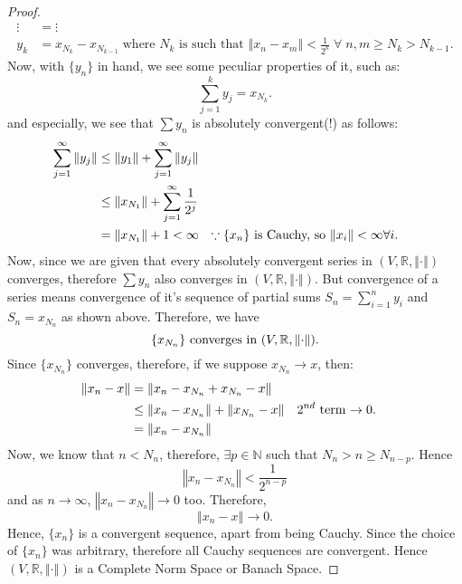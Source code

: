 \documentclass{article}
\theoremstyle{definition}
\theoremstyle{remark}
\theoremstyle{definition}
\theoremstyle{definition}
\theoremstyle{definition}
\newcommand{\norm}[1]{\left \Vert #1 \right \Vert}
\newcommand{\R}{\mathbb{R}}
\newcommand{\N}{\mathbb{N}}
\begin{document}
\begin{proof}
\begin{align*}
		\vdots &= \vdots\\
			y_k &= x_{N_k} - x_{N_{k-1}} \;\text{where } N_k \text{ is such that } \norm{x_n - x_m} < \frac{1}{2^{k}}  \;\forall\; n,m\ge N_k > N_{k-1}.
\end{align*}
Now, with $ \{y_n\} $ in hand, we see some peculiar properties of it, such as:
\[\sum_{j=1}^{k} y_j= x_{N_k}.\]
and especially, we see that $ \sum y_n $ is absolutely convergent(!) as follows:
\begin{align*}
	\sum_{j=1}^{\infty} \norm{y_j} &\le \norm{y_1} + \sum_{j=1}^{\infty} \norm{y_j}\\
	&\le \norm{x_{N_1}} + \sum_{j=1}^{\infty} \frac{1}{2^{j}}\\
	&= \norm{x_{N_1}} + 1 < \infty&&\text{$ \because \{x_n\}$ is Cauchy, so $ \norm{x_i} < \infty\forall i$. }
\end{align*} 
Now, since we are given that every absolutely convergent series in $ (V,\R,\norm{\cdot}) $ converges, therefore $ \sum y_n $ also converges in $ (V,\R,\norm{\cdot}) $. But convergence of a series means convergence of it's sequence of partial sums $ S_n = \sum_{i=1}^{n} y_i $ and $ S_n = x_{N_{n}} $ as shown above. Therefore, we have
\[\{x_{N_{n}}\} \text{ converges in $ (V,\R,\norm{\cdot}) $.} \] 
Since $ \{x_{N_n}\} $ converges, therefore, if we suppose $ x_{N_n}\to x $, then:
\begin{align*}
	\norm{x_n - x} &=\norm{x_n - x_{N_n} + x_{N_n} - x}\\
	&\le \norm{x_n - x_{N_n}} + \norm{x_{N_n} - x}&&\text{$ 2^{nd} $ term $ \to 0 $.}\\
	&= \norm{x_n -x_{N_n}} 
\end{align*}
Now, we know that $ n < N_n $, therefore, $ \exists p\in \N$ such that $ N_n > n \ge N_{n-p} $. Hence
\[\norm{x_n - x_{N_n}} < \frac{1}{2^{n-p}}\]
and as $ n\to \infty $, $ \norm{x_n - x_{N_n}} \to 0 $ too.
Therefore,
\[\norm{x_n - x} \to 0.\]
Hence, $ \{x_n\} $ is a convergent sequence, apart from being Cauchy. Since the choice of $ \{x_n\} $ was arbitrary, therefore all Cauchy sequences are convergent. Hence $ (V,\R,\norm{\cdot}) $ is a Complete Norm Space or Banach Space.
\end{proof}
\hrulefill
\newpage
\end{document}
